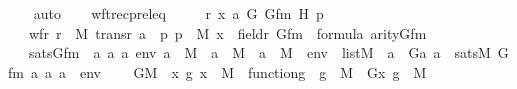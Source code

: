 \begin{isabellebody}
\ \ \isamarkupfalse%
\ auto%
\endisatagproof
{\isafoldproof}%
%
\isadelimproof
\isanewline
%
\endisadelimproof
\ \ \isanewline
\isanewline
{}\isamarkupfalse%
\ wftrec{\isacharunderscore}{\kern0pt}prel{\isacharunderscore}{\kern0pt}eq\ {\isacharcolon}{\kern0pt}\ \isanewline
\ \ \ r\ x\ a\ G\ Gfm\ H\ p\isanewline
\ \ \ {\isachardoublequoteopen}wf{\isacharparenleft}{\kern0pt}r{\isacharparenright}{\kern0pt}{\isachardoublequoteclose}\ {\isachardoublequoteopen}r\ {\isasymin}\ M{\isachardoublequoteclose}\ {\isachardoublequoteopen}trans{\isacharparenleft}{\kern0pt}r{\isacharparenright}{\kern0pt}{\isachardoublequoteclose}\ {\isachardoublequoteopen}a\ {\isasymin}\ p{\isachardoublequoteclose}\ {\isachardoublequoteopen}p\ {\isasymin}\ M{\isachardoublequoteclose}\ {\isachardoublequoteopen}x\ {\isasymin}\ field{\isacharparenleft}{\kern0pt}r{\isacharparenright}{\kern0pt}{\isachardoublequoteclose}\ {\isachardoublequoteopen}Gfm\ {\isasymin}\ formula{\isachardoublequoteclose}\ {\isachardoublequoteopen}arity{\isacharparenleft}{\kern0pt}Gfm{\isacharparenright}{\kern0pt}\ {\isasymle}\ {}{\isachardoublequoteclose}\ \isanewline
\ \ \ satsGfm{\isacharcolon}{\kern0pt}\ {\isachardoublequoteopen}\ {\isacharparenleft}{\kern0pt}{\isasymAnd}a{}\ a{}\ a{}\ env{\isachardot}{\kern0pt}\ a{}\ {\isasymin}\ M\ {\isasymLongrightarrow}\ a{}\ {\isasymin}\ M\ {\isasymLongrightarrow}\ a{}\ {\isasymin}\ M\ {\isasymLongrightarrow}\ env\ {\isasymin}\ list{\isacharparenleft}{\kern0pt}M{\isacharparenright}{\kern0pt}\ {\isasymLongrightarrow}\ a{}\ {\isacharequal}{\kern0pt}\ G{\isacharparenleft}{\kern0pt}a{}{\isacharcomma}{\kern0pt}\ a{}{\isacharparenright}{\kern0pt}\ {\isasymlongleftrightarrow}\ sats{\isacharparenleft}{\kern0pt}M{\isacharcomma}{\kern0pt}\ Gfm{\isacharcomma}{\kern0pt}\ {\isacharbrackleft}{\kern0pt}a{}{\isacharcomma}{\kern0pt}\ a{}{\isacharcomma}{\kern0pt}\ a{}{\isacharbrackright}{\kern0pt}\ {\isacharat}{\kern0pt}\ env{\isacharparenright}{\kern0pt}{\isacharparenright}{\kern0pt}{\isachardoublequoteclose}\ \isanewline
\ \ \ GM\ {\isacharcolon}{\kern0pt}\ {\isachardoublequoteopen}{\isasymAnd}x\ g{\isachardot}{\kern0pt}\ x\ {\isasymin}\ M\ {\isasymLongrightarrow}\ function{\isacharparenleft}{\kern0pt}g{\isacharparenright}{\kern0pt}\ {\isasymLongrightarrow}\ g\ {\isasymin}\ M\ {\isasymLongrightarrow}\ G{\isacharparenleft}{\kern0pt}x{\isacharcomma}{\kern0pt}\ g{\isacharparenright}{\kern0pt}\ {\isasymin}\ M{\isachardoublequoteclose}\ \ \isanewline

\end{isabellebody}

